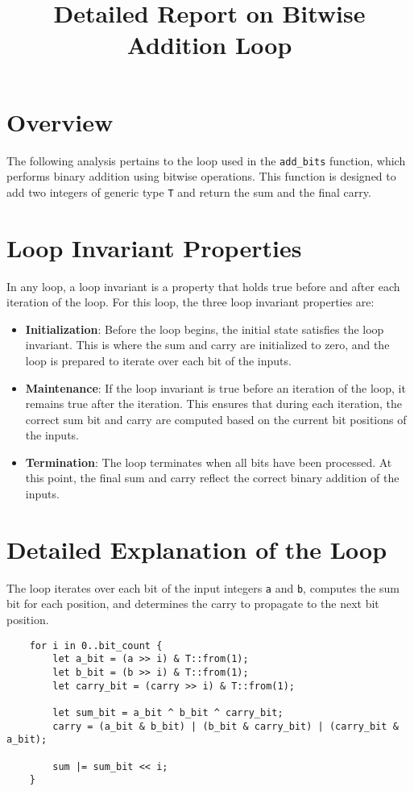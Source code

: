 \documentclass{article}
\title{Detailed Report on Bitwise Addition Loop}
\author{}
\date{}
\begin{document}
\maketitle

\section*{Overview}

The following analysis pertains to the loop used in the \texttt{add\_bits} function, which performs binary addition using bitwise operations. This function is designed to add two integers of generic type \texttt{T} and return the sum and the final carry.

\section*{Loop Invariant Properties}

In any loop, a loop invariant is a property that holds true before and after each iteration of the loop. For this loop, the three loop invariant properties are:

\begin{itemize}
    \item \textbf{Initialization}: Before the loop begins, the initial state satisfies the loop invariant. This is where the sum and carry are initialized to zero, and the loop is prepared to iterate over each bit of the inputs.
    \item \textbf{Maintenance}: If the loop invariant is true before an iteration of the loop, it remains true after the iteration. This ensures that during each iteration, the correct sum bit and carry are computed based on the current bit positions of the inputs.
    \item \textbf{Termination}: The loop terminates when all bits have been processed. At this point, the final sum and carry reflect the correct binary addition of the inputs.
\end{itemize}

\section*{Detailed Explanation of the Loop}

The loop iterates over each bit of the input integers \texttt{a} and \texttt{b}, computes the sum bit for each position, and determines the carry to propagate to the next bit position.

\begin{verbatim}
    for i in 0..bit_count {
        let a_bit = (a >> i) & T::from(1);
        let b_bit = (b >> i) & T::from(1);
        let carry_bit = (carry >> i) & T::from(1);

        let sum_bit = a_bit ^ b_bit ^ carry_bit;
        carry = (a_bit & b_bit) | (b_bit & carry_bit) | (carry_bit & a_bit);

        sum |= sum_bit << i;
    }
\end{verbatim}
\end{document}
